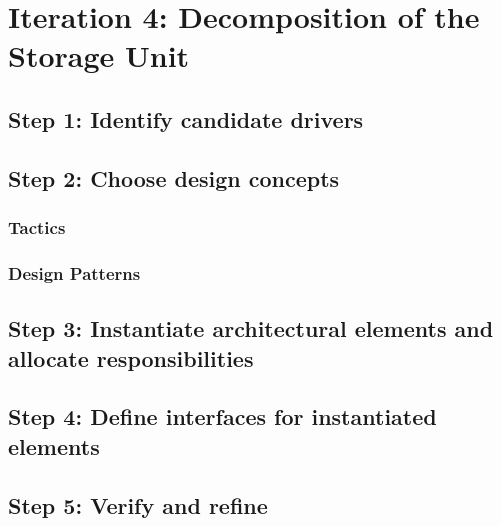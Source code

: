 \section{Iteration 4: Decomposition of the Storage Unit}
\label{add:it4}

\subsection{Step 1: Identify candidate drivers}
\label{add:it4/drivers}

\subsection{Step 2: Choose design concepts}
\label{add:it4/concepts}

\subsubsection{Tactics}
\label{add:it4/tactics}

\subsubsection{Design Patterns}
\label{add:it4/patterns}

\subsection{Step 3: Instantiate architectural elements and allocate responsibilities}
\label{add:it4/elements}

\subsection{Step 4: Define interfaces for instantiated elements}
\label{add:it4/interfaces}

\subsection{Step 5: Verify and refine}
\label{add:it4/verification}